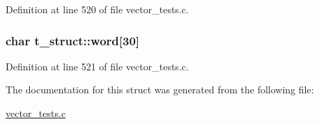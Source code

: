 Definition at line 520 of file vector\_\-tests.c.

\hypertarget{structt__struct_ab5b290b572fc4036f1e5efc671098c7f}{
\subsubsection[{word}]{\setlength{\rightskip}{0pt plus 5cm}char {\bf t\_\-struct::word}\mbox{[}30\mbox{]}}}
\label{structt__struct_ab5b290b572fc4036f1e5efc671098c7f}


Definition at line 521 of file vector\_\-tests.c.



The documentation for this struct was generated from the following file:\begin{DoxyCompactItemize}
\item 
\hyperlink{vector__tests_8c}{vector\_\-tests.c}\end{DoxyCompactItemize}
